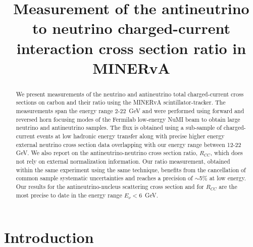 \documentclass[aps,preprint,showpacs,superscriptaddress,linenumbers,nofootinbib,prd,12pt]{revtex4}
\newcommand{\ratio}{\ensuremath{R_{CC}}}
\begin{document}
\title{Measurement of the antineutrino to neutrino charged-current interaction cross section ratio in MINERvA}


\begin{abstract}
We present measurements of the neutrino and antineutrino total charged-current 
cross sections on carbon and their ratio 
using the MINERvA scintillator-tracker. The measurements 
span the energy range 2-22~GeV and were performed using 
forward and reversed horn focusing modes of the
Fermilab low-energy NuMI 
beam to obtain large neutrino and antineutrino samples.
The flux is obtained using a sub-sample of 
charged-current events at low hadronic energy transfer along 
with precise higher energy external neutrino cross section data overlapping with our energy range between 12-22 GeV. 
We also report on the antineutrino-neutrino cross section 
ratio, \ratio{},
which does not rely on external normalization information.
Our ratio measurement, obtained within the same experiment using the same technique, benefits from the cancellation of 
common sample systematic uncertainties and reaches a precision of
$\sim$5\% at low energy. Our results for the antineutrino-nucleus scattering cross section and for \ratio{} are the most precise to date 
in the energy range $E_{\nu} < 6$~GeV.

\end{abstract}

\maketitle

\section{Introduction}
\end{document}

